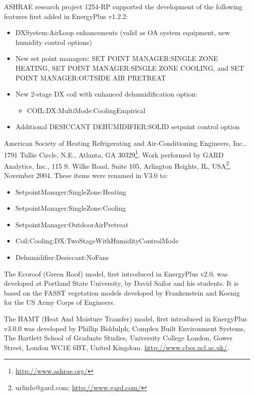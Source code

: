 ASHRAE research project 1254-RP supported the development of the following features first added in EnergyPlus v1.2.2: 
\begin{itemize}
  \item DXSystem:AirLoop enhancements (valid as OA system equipment, new humidity control options)
  \item New set point managers: SET POINT MANAGER:SINGLE ZONE HEATING, SET POINT MANAGER:SINGLE ZONE COOLING, and SET POINT MANAGER:OUTSIDE AIR PRETREAT
  \item New 2-stage DX coil with enhanced dehumidification option:
  \begin{itemize}
    \item COIL:DX:MultiMode:CoolingEmpirical
  \end{itemize}
  \item Additional DESICCANT DEHUMIDIFIER:SOLID setpoint control option
\end{itemize}

American Society of Heating Refrigerating and Air-Conditioning Engineers, Inc., 1791 Tullie Circle, N.E., Atlanta, GA 30329\footnote{\url{http://www.ashrae.org/}}. Work performed by GARD Analytics, Inc., 115 S. Wilke Road, Suite 105, Arlington Heights, IL, USA\footnote{url{info@gard.com}; \url{http://www.gard.com/}}, November 2004. These items were renamed in V3.0 to:
\begin{itemize}
  \item SetpointManager:SingleZone:Heating
  \item SetpointManager:SingleZone:Cooling
  \item SetpointManager:OutdoorAirPretreat
  \item Coil:Cooling:DX:TwoStageWithHumidityControlMode
  \item Dehumidifier:Desiccant:NoFans
\end{itemize}

The Ecoroof (Green Roof) model, first introduced in EnergyPlus v2.0, was developed at Portland State University, by David Sailor and his students. It is based on the FASST vegetation models developed by Frankenstein and Koenig for the US Army Corps of Engineers.

The HAMT (Heat And Moisture Transfer) model, first introduced in EnergyPlus v3.0.0 was developed by Phillip Biddulph, Complex Built Environment Systems, The Bartlett School of Graduate Studies, University College London, Gower Street, London WC1E 6BT, United Kingdom. \url{http://www.cbes.ucl.ac.uk/}.

